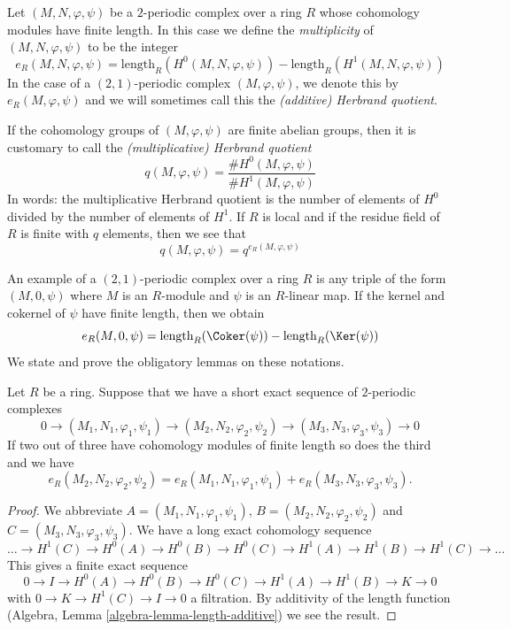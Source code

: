 \begin{definition}
\label{definition-periodic-length}
Let $(M, N, \varphi, \psi)$ be a $2$-periodic complex
over a ring $R$ whose cohomology modules have finite length.
In this case we define the {\it multiplicity} of $(M, N, \varphi, \psi)$
to be the integer
$$
e_R(M, N, \varphi, \psi) =
\text{length}_R(H^0(M, N, \varphi, \psi))
-
\text{length}_R(H^1(M, N, \varphi, \psi))
$$
In the case of a $(2, 1)$-periodic complex $(M, \varphi, \psi)$,
we denote this by $e_R(M, \varphi, \psi)$ and we will sometimes call this
the {\it (additive) Herbrand quotient}.
\end{definition}

\noindent
If the cohomology groups of $(M, \varphi, \psi)$
are finite abelian groups, then it is customary to call the
{\it (multiplicative) Herbrand quotient}
$$
q(M, \varphi, \psi) =
\frac{\# H^0(M, \varphi, \psi)}{\# H^1(M, \varphi, \psi)}
$$
In words: the multiplicative Herbrand quotient is the number of elements of
$H^0$ divided by the number of elements of $H^1$. If $R$ is local and if
the residue field of $R$ is finite with $q$ elements, then we see that
$$
q(M, \varphi, \psi) = q^{e_R(M, \varphi, \psi)}
$$

\medskip\noindent
An example of a $(2, 1)$-periodic complex over a ring $R$ is any triple of
the form $(M, 0, \psi)$ where $M$ is an $R$-module and $\psi$ is an
$R$-linear map. If the kernel and cokernel of $\psi$ have finite length,
then we obtain
\begin{equation}
\label{equation-multiplicity-coker-ker}
e_R(M, 0, \psi) = \text{length}_R(\Coker(\psi)) - \text{length}_R(\Ker(\psi))
\end{equation}
We state and prove the obligatory lemmas on these notations.

\begin{lemma}
\label{lemma-additivity-periodic-length}
Let $R$ be a ring. Suppose that we have a short exact sequence of
$2$-periodic complexes
$$
0 \to (M_1, N_1, \varphi_1, \psi_1)
\to (M_2, N_2, \varphi_2, \psi_2)
\to (M_3, N_3, \varphi_3, \psi_3)
\to 0
$$
If two out of three have cohomology modules of finite length so does
the third and we have
$$
e_R(M_2, N_2, \varphi_2, \psi_2) =
e_R(M_1, N_1, \varphi_1, \psi_1) +
e_R(M_3, N_3, \varphi_3, \psi_3).
$$
\end{lemma}

\begin{proof}
We abbreviate $A = (M_1, N_1, \varphi_1, \psi_1)$,
$B = (M_2, N_2, \varphi_2, \psi_2)$ and $C = (M_3, N_3, \varphi_3, \psi_3)$.
We have a long exact cohomology sequence
$$
\ldots
\to H^1(C)
\to H^0(A)
\to H^0(B)
\to H^0(C)
\to H^1(A)
\to H^1(B)
\to H^1(C)
\to \ldots
$$
This gives a finite exact sequence
$$
0 \to I
\to H^0(A)
\to H^0(B)
\to H^0(C)
\to H^1(A)
\to H^1(B)
\to K \to 0
$$
with $0 \to K \to H^1(C) \to I \to 0$ a filtration. By additivity of
the length function (Algebra, Lemma \ref{algebra-lemma-length-additive})
we see the result.
\end{proof}

